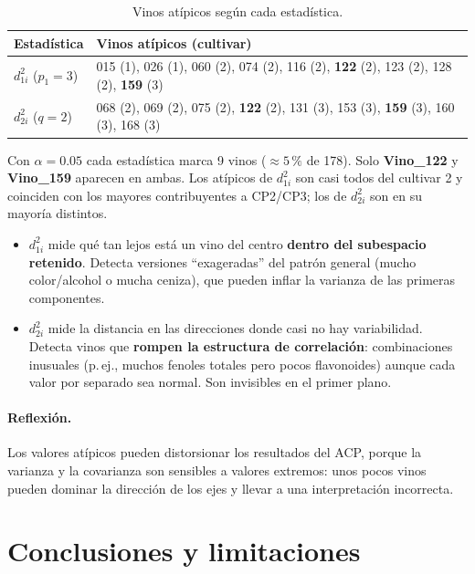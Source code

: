 \documentclass[11pt,a4paper]{article}
\begin{document}
\begin{table}[H]
\centering\small
\caption{Vinos atípicos según cada estadística.}
\begin{tabular}{p{3.5cm}p{10cm}}
\toprule
Estadística & Vinos atípicos (cultivar) \\
\midrule
$d^2_{1i}$ ($p_1 = 3$) & 015 (1), 026 (1), 060 (2), 074 (2), 116 (2), \textbf{122} (2), 123 (2), 128 (2), \textbf{159} (3) \\
$d^2_{2i}$ ($q = 2$) & 068 (2), 069 (2), 075 (2), \textbf{122} (2), 131 (3), 153 (3), \textbf{159} (3), 160 (3), 168 (3) \\
\bottomrule
\end{tabular}
\end{table}

Con $\alpha = 0.05$ cada estadística marca 9 vinos ($\approx 5\,\%$ de 178). Solo \textbf{Vino\_122} y \textbf{Vino\_159} aparecen en ambas. Los atípicos de $d^2_{1i}$ son casi todos del cultivar 2 y coinciden con los mayores contribuyentes a CP2/CP3; los de $d^2_{2i}$ son en su mayoría distintos.
\begin{itemize}[leftmargin=*]
  \item $d^2_{1i}$ mide qué tan lejos está un vino del centro \textbf{dentro del subespacio retenido}. Detecta versiones ``exageradas'' del patrón general (mucho color/alcohol o mucha ceniza), que pueden inflar la varianza de las primeras componentes.
  \item $d^2_{2i}$ mide la distancia en las direcciones donde casi no hay variabilidad. Detecta vinos que \textbf{rompen la estructura de correlación}: combinaciones inusuales (p.\,ej., muchos fenoles totales pero pocos flavonoides) aunque cada valor por separado sea normal. Son invisibles en el primer plano.
\end{itemize}

\paragraph{Reflexión.} Los valores atípicos pueden distorsionar los resultados del ACP, porque la varianza y la covarianza son sensibles a valores extremos: unos pocos vinos pueden dominar la dirección de los ejes y llevar a una interpretación incorrecta.

\section{Conclusiones y limitaciones}
\end{document}
